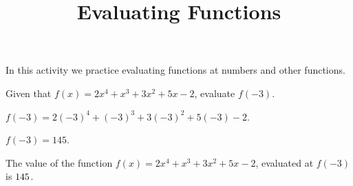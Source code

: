 \documentclass{ximera}
\begin{document}
\title{Evaluating Functions}
\maketitle


\begin{headline} %
In this activity we practice evaluating functions at numbers and other
functions.
\end{headline}

\begin{exercise}
Given that $f(x)=2 x^4+x^3+3 x^2+5 x-2$, evaluate $f(-3)$.
\begin{solution}
\begin{hint}
$f(-3)=2 (-3)^4+(-3)^3+3 (-3)^2+5 (-3)-2$.
\end{hint}
\begin{hint}
$f(-3)=145$.
\end{hint}
The value of the function $f(x) = 2 x^4+x^3+3 x^2+5 x-2$, evaluated
at $f(-3)$ is ${145}$.
\end{solution}
\end{exercise}
\end{document}
